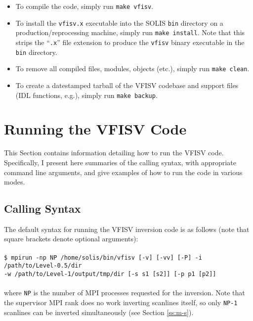 \documentclass[11pt]{article}
\begin{document}
\begin{itemize}
        \begin{itemize}
        \renewcommand\labelitemii{\textbullet}
          \item To compile the code, simply run \texttt{make vfisv}.
          \item To install the \texttt{vfisv.x} executable into the SOLIS \texttt{bin}
                directory on a production/reprocessing machine, simply run \texttt{make install}.  Note that
                this strips the ``\texttt{.x}'' file extension to produce the \texttt{vfisv} binary executable
                in the \texttt{bin} directory.
          \item To remove all compiled files, modules, objects (etc.), simply run \texttt{make clean}.
          \item To create a datestamped tarball of the VFISV codebase and support files (IDL functions, e.g.), simply
                run \texttt{make backup}.
        \end{itemize}
\end{itemize}


\clearpage
\section{Running the VFISV Code}

This Section contains information detailing how to run the VFISV code.  Specifically, I present
here summaries of the calling syntax, with appropriate command line arguments, and give
examples of how to run the code in various modes.

\subsection{Calling Syntax}
The default syntax for running the VFISV inversion code is as follows (note that square brackets
denote optional arguments):\\
\\
\texttt{\$ mpirun -np NP /home/solis/bin/vfisv [-v] [-vv] [-P] -i /path/to/Level-0.5/dir\\
-w /path/to/Level-1/output/tmp/dir [-s s1 [s2]] [-p p1 [p2]]}\\
\\
where \texttt{NP} is the number of MPI processes requested for the inversion.  Note that the supervisor MPI rank
does no work inverting scanlines itself, so only \texttt{NP-1} scanlines can be inverted simultaneously (see
Section \ref{ss:m-s}).
\end{document}
